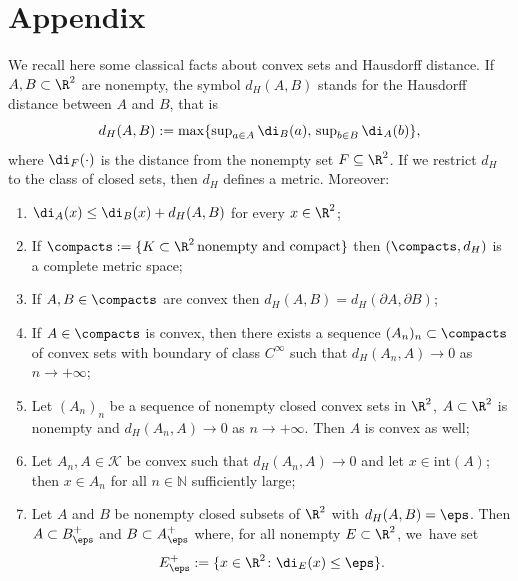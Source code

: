 \appendix
\section*{Appendix}

We recall here some classical facts about convex sets and Hausdorff distance.
If~$A,B\subset\R^2$ are nonempty, the symbol $d_H(A,B)$
stands for the Hausdorff distance between $A$ and $B$, that is
\begin{equation*}
\textstyle
d_H(A,B):=\max\{\sup_{a\in A}
\di_B(a),\,\sup_{b\in B}\di_A(b)\},
\end{equation*}
where $\di_F(\cdot)$ is the distance from the nonempty set $F\subseteq \R^2$.
If we restrict $d_H$ to the class of closed sets,
then $d_H$ defines a metric. Moreover:
\begin{enumerate}[label=(H\arabic*),wide]
\item \label{H1}
$\di_A(x)\le \di_B(x)+d_H(A,B)$
for every $x\in\R^2$;
\item \label{H2}
If $\compacts:=\{K\subset\R^2\, \text{nonempty and compact}\}$
then $(\compacts,d_H)$
is a complete metric space;
\item \label{H3}
If $A, B \in \compacts$ are convex then $d_H(A,B)=d_H(\partial A,\partial B)$;
\item \label{H4}
If $A\in \compacts$ is convex,
then there exists a sequence $(A_n)_{n} \subset \compacts$
of convex sets with boundary of class $C^\infty$ such that
$d_H(A_n,A)\to0$ as $n\to +\infty$;
\item \label{H5} Let $(A_n)_{n}$
be a sequence of nonempty closed convex sets in $\R^2$, $A\subset\R^2$ is nonempty and $d_H(A_n,A)\to0$ as $n\to +\infty$. Then $A$ is convex as well;
\item\label{H6} Let $A_n,A\in\mathcal K$ be convex such that $d_H(A_n,A)\to0$ and let $x\in \mathrm{int}(A)$; then $x\in A_n$ for all $n\in \mathbb N$ sufficiently large;
\item \label{H7} Let $A$ and $B$ be nonempty closed subsets of $\R^2$ with $d_H(A,B)=\eps$. Then $A\subset B^+_\eps$ and $B\subset A^+_\eps$
where, for all nonempty $E\subset \R^2$, we~have set
\[
E^+_\eps:=\{x\in\R^2\colon \di_E(x)\le\eps\}.
\]
\end{enumerate}
